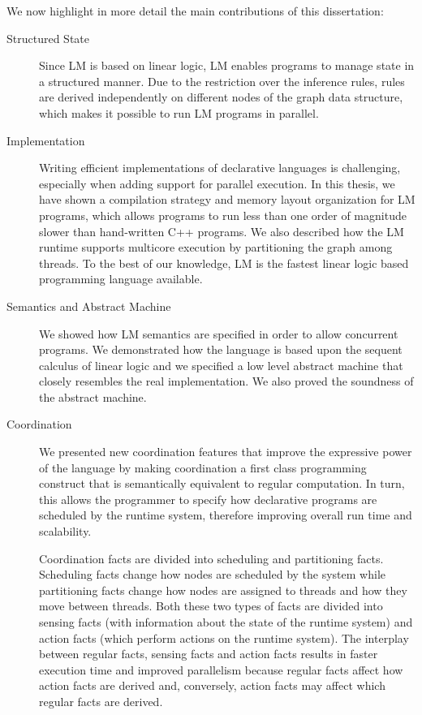 We now highlight in more detail the main contributions of this dissertation:

\begin{description}
   \item[Structured State]

Since LM is based on linear logic, LM enables programs to manage state in a
structured manner. Due to the restriction over the inference rules, rules are
derived independently on different nodes of the graph data structure, which
makes it possible to run LM programs in parallel.

   \item[Implementation]

Writing efficient implementations of declarative languages is challenging,
especially when adding support for parallel execution. In this thesis, we have
shown a compilation strategy and memory layout organization for LM programs,
which allows programs to run less than one order of magnitude slower than
hand-written C++ programs. We also described how the LM runtime supports
multicore execution by partitioning the graph among threads. To the best of our
knowledge, LM is the fastest linear logic based programming language available.

\item[Semantics and Abstract Machine]

We showed how LM semantics are specified in order to allow concurrent
programs. We demonstrated how the language is based upon the sequent calculus of
linear logic and we specified a low level abstract machine that closely
resembles the real implementation. We also proved the soundness of the
abstract machine.

\item[Coordination]

We presented new coordination features that improve the expressive
power of the language by making coordination a first class programming construct
that is semantically equivalent to regular computation. In turn, this allows the
programmer to specify how declarative programs are scheduled by the runtime
system, therefore improving overall run time and scalability.

Coordination facts are divided into scheduling and partitioning facts.
Scheduling facts change how nodes are scheduled by the system while partitioning
facts change how nodes are assigned to threads and how they move between
threads. Both these two types of facts are divided into sensing facts (with
information about the state of the runtime system) and action facts (which
perform actions on the runtime system). The interplay between regular facts,
sensing facts and action facts results in faster execution time and improved
parallelism because regular facts affect how action facts are derived and,
conversely, action facts may affect which regular facts are derived.


\end{description}
